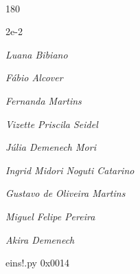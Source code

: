 \documentclass[12pt]{article}
\begin{document}

\pagebreak			

	\ 
	\vfill
	\begin{turn}{180}	
		\begin{minipage}{\textwidth}
		  	\ttfamily %
			\centering
			{\Huge 2e-2}
		  
			\hfill
		  
			

\textit{\small Luana Bibiano}

\textit{\small Fábio Alcover}

\textit{\small Fernanda Martins}

\textit{\small Vizette Priscila Seidel}

\textit{\small Júlia Demenech Mori}

\textit{\small Ingrid Midori Noguti Catarino}

\textit{\small Gustavo de Oliveira Martins}

\textit{\small Miguel Felipe Pereira}

\textit{\small Akira Demenech}

\bigskip

eins!.py
0x0014


		\end{minipage}	
	\end{turn}
	\vfill
	\

\pagebreak
\end{document}
